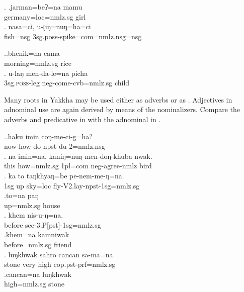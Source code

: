 \ex. \ag.jarman=beʔ=na mamu\\ 
	germany{\sc =loc=nmlz.sg} girl		\\ 
	\bg. nasa=ci, u-ʈiŋ=nuŋ=ha=ci\\
		fish{\sc =nsg}	{\sc 3sg.poss-}spike{\sc =com=nmlz.nsg=nsg}\\
			 
			
		
			
 	\ex.\ag.bhenik=na cama\\
	morning{\sc =nmlz.sg} rice\\
	 \bg. u-laŋ men-da-le=na picha\\ 
	{\sc 3sg.\textsc{poss}}-leg {\sc neg-}come-{\sc cvb=nmlz.sg} child\\ 

	
Many roots in Yakkha may be used either as adverbs or as . Adjectives in adnominal use are again derived by means of the nominalizers. Compare the adverbs and predicative  in \Next[a, c, e, g]  with the adnominal  in \Next[b, d, f, h].
	
 

\ex.\ag.haku imin coŋ-me-ci-g=ha?\\
	now how do{\sc -npst-du-2=nmlz.nsg}{\sc }{\sc }	\\
	 
 	\bg. na  imin=na,        kaniŋ=nuŋ   men-doŋ-khuba     nwak.\\
	this how{\sc =nmlz.sg} {\sc 1pl=com} {\sc neg}-agree-{\sc nmlz} bird\\
	 
	\bg. ka to taŋkhyaŋ=be   pe-nem-me-ŋ=na.\\ 
	{\sc 1sg} up sky{\sc =loc} fly-{\sc V2.lay-npst-1sg=nmlz.sg}		\\ 
	 
	\bg.to=na paŋ\\
	up{\sc =nmlz.sg} house\\
	 \bg. khem nis-u-ŋ=na.\\ 
	before see-{\sc 3.P[pst]-1sg=nmlz.sg}		\\ 
	\bg.khem=na  kamniwak\\
	before{\sc =nmlz.sg}  friend\\
	\bg.  luŋkhwak sahro cancan sa-ma=na.\\
	stone very high {\sc cop.pst-prf=nmlz.sg}	\\
	 
 	\bg.cancan=na luŋkhwak\\
	high{\sc =nmlz.sg} stone\\



